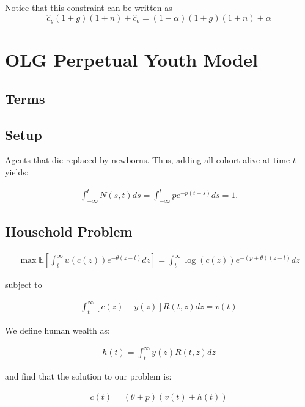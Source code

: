 \documentclass[10pt]{article}
\begin{document}
Notice that this constraint can be written as
$$
\hat{c}_y(1+g)(1+n)+\hat{c}_o=(1-\alpha)(1+g)(1+n)+\alpha
$$

\section{OLG Perpetual Youth Model}

\subsection{Terms}



\subsection{Setup}

Agents that die replaced by newborns. Thus, 
adding all cohort alive at time $t$ yields:

\begin{align}
    \int_{-\infty}^t N(s, t) d s=\int_{-\infty}^t p e^{-p(t-s)} d s=1 .
\end{align}

\subsection{Household Problem}

\begin{align}
    \max \mathbb{E}\left[\int_t^{\infty} u(c(z)) e^{-\theta(z-t)} d z\right]=\int_t^{\infty} \log (c(z)) e^{-(p+\theta)(z-t)} d z
\end{align}

subject to 

\begin{align}
    \int_t^{\infty}[c(z)-y(z)] R(t, z) d z=v(t)
\end{align}

We define human wealth as:

\begin{align}
    h(t)=\int_t^{\infty} y(z) R(t, z) d z
\end{align}

and find that the solution to our problem is:

\begin{align}
    c(t)=(\theta+p)(v(t)+h(t))
\end{align}
\end{document}
